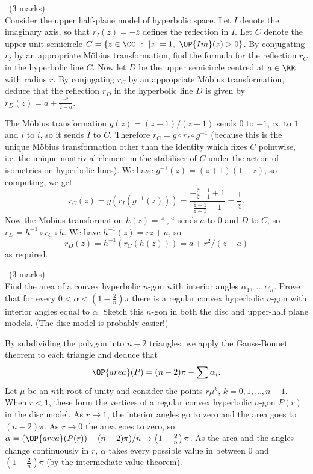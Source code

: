 \documentclass[12pt]{article}
\begin{document}
\vspace{1cm}

\begin{question}\ (3 marks)\\
  Consider the upper half-plane model of hyperbolic space. Let $I$ denote the imaginary axis, so that $r_I(z)=-\bar{z}$ defines the reflection in $I$. Let $C$ denote the upper unit semicircle $C=\{z\in\CC\ :\ |z|=1,\ \OP{Im}(z)>0\}$. By conjugating $r_I$ by an appropriate M\"obius transformation, find the formula for the reflection $r_C$ in the hyperbolic line $C$. Now let $D$ be the upper semicircle centred at $a\in\RR$ with radius $r$. By conjugating $r_C$ by an appropriate M\"obius transformation, deduce that the reflection $r_D$ in the hyperbolic line $D$ is given by $r_D(z)=a+\frac{r^2}{\bar{z}-a}$.
\end{question}

\begin{answer}
  The M\"obius transformation $g(z)=(z-1)/(z+1)$ sends $0$ to $-1$, $\infty$ to $1$ and $i$ to $i$, so it sends $I$ to $C$. Therefore $r_C=g\circ r_I\circ g^{-1}$ (because this is the unique M\"obius transformation other than the identity which fixes $C$ pointwise, i.e. the unique nontrivial element in the stabiliser of $C$ under the action of isometries on hyperbolic lines). We have $g^{-1}(z)=(z+1)(1-z)$, so computing, we get
  \[r_C(z)=g(r_I(g^{-1}(z)))=\frac{-\frac{\bar{z}-1}{\bar{z}+1}+1}{\frac{\bar{z}-1}{\bar{z}+1}+1}=\frac{1}{\bar{z}}.\]
  Now the M\"obius transformation $h(z)=\frac{z-a}{r}$ sends $a$ to $0$ and $D$ to $C$, so $r_D=h^{-1}\circ r_C\circ h$. We have $h^{-1}(z)=rz+a$, so
  \[r_D(z)=h^{-1}(r_C(h(z)))=a+r^2/(\bar{z}-a)\]
  as required.
\end{answer}
\newpage

\vspace{1cm}

\begin{question}\ (3 marks)\\
  Find the area of a convex hyperbolic $n$-gon with interior angles $\alpha_1,\ldots,\alpha_n$. Prove that for every $0<\alpha<\left(1-\frac{2}{n}\right)\pi$ there is a regular convex hyperbolic $n$-gon with interior angles equal to $\alpha$. Sketch this $n$-gon in both the disc and upper-half plane models. (The disc model is probably easier!)
\end{question}

\begin{answer}
  By subdividing the polygon into $n-2$ triangles, we apply the Gauss-Bonnet theorem to each triangle and deduce that
  \[\OP{area}(P)=(n-2)\pi-\sum\alpha_i.\]
  Let $\mu$ be an $n$th root of unity and consider the points $r\mu^k$, $k=0,1,\ldots,n-1$. When $r<1$, these form the vertices of a regular convex hyperbolic $n$-gon $P(r)$ in the disc model. As $r\to 1$, the interior angles go to zero and the area goes to $(n-2)\pi$. As $r\to 0$ the area goes to zero, so $\alpha=(\OP{area}(P(r))-(n-2)\pi)/n\to \left(1-\frac{2}{n}\right)\pi$. As the area and the angles change continuously in $r$, $\alpha$ takes every possible value in between $0$ and $\left(1-\frac{2}{n}\right)\pi$ (by the intermediate value theorem).
\end{answer}
\newpage
\end{document}

